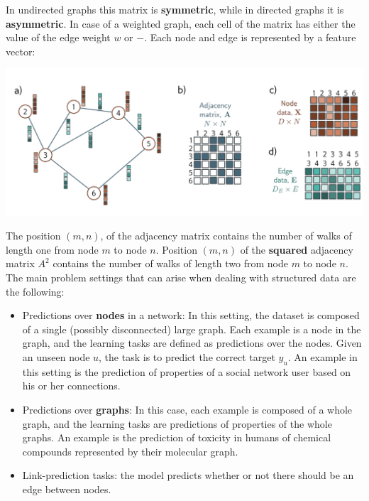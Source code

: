 In undirected graphs this matrix is \textbf{symmetric}, while in directed graphs it is \textbf{asymmetric}. In case of a weighted graph, each cell of the matrix has either the value of the edge weight $w$ or $-$. Each node and edge is represented by a feature vector:
\begin{center}
    \includegraphics[scale=0.5]{images/graphs.png}
\end{center}
The position $(m,n)$, of the adjacency matrix contains the number of walks of length one from node $m$ to node $n$. Position $(m,n)$ of the \textbf{squared} adjacency matrix $A^2$ contains the number of walks of length two from node $m$ to node $n$.\newline\newline
The main problem settings that can arise when dealing with structured data are the following:
\begin{itemize}
    \item Predictions over \textbf{nodes} in a network: In this setting, the dataset is composed of a single (possibly disconnected) large graph. Each example is a node in the graph, and the learning tasks are defined as predictions over the nodes. Given an unseen node $u$, the task is to predict the correct target $y_u$. An example in this setting is the prediction of properties of a social network user based on his or her connections.

    \item Predictions over \textbf{graphs}: In this case, each example is composed of a whole graph, and the learning tasks are predictions of properties of the whole graphs. An example is the prediction of toxicity in humans of chemical compounds represented by their molecular graph.

    \item Link-prediction tasks: the model predicts whether or not there should be an edge between nodes. 
\end{itemize}

